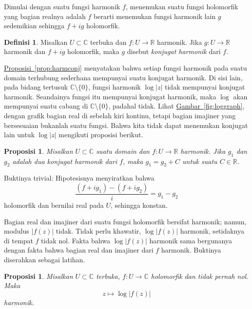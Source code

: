 \documentclass[12pt,openany]{book}
\newcommand{\sabs}[1]{\lvert {#1} \rvert}
\newcommand{\C}{{\mathbb{C}}}
\newcommand{\R}{{\mathbb{R}}}
\newcommand{\myindex}[1]{#1\index{#1}}
\theoremstyle{plain}
\newtheorem{prop}[thm]{Proposisi}
\theoremstyle{remark}
\theoremstyle{definition}
\newtheorem{defn}[thm]{Definisi}
\theoremstyle{exercise}
\theoremstyle{example}
\newcommand{\figureref}[1]{\hyperref[#1]{Gambar~\ref*{#1}}}
\newcommand{\propref}[1]{\hyperref[#1]{Proposisi~\ref*{#1}}}
\begin{document}
Dimulai dengan suatu fungsi harmonik $f$, menemukan suatu fungsi holomorfik yang
bagian realnya adalah $f$ berarti menemukan fungsi harmonik lain $g$ sedemikian sehingga $f+ig$
holomorfik.

\begin{defn}
Misalkan $U \subset \C$ terbuka dan $f \colon U \to \R$ harmonik.
Jika $g \colon U \to \R$ harmonik dan $f + i g$ holomorfik,
maka $g$ disebut \emph{\myindex{konjugat harmonik}} dari $f$.
\end{defn}

\propref{prop:harmconj}
menyatakan bahwa setiap fungsi harmonik pada suatu domain terhubung sederhana
mempunyai suatu konjugat harmonik. Di sisi lain, pada bidang tertusuk
$\C \setminus \{ 0 \}$, fungsi harmonik $\log \sabs{z}$
tidak mempunyai konjugat harmonik. Seandainya fungsi itu mempunyai konjugat harmonik,
maka $\log$ akan mempunyai suatu cabang di $\C \setminus \{0\}$, padahal tidak.
Lihat \figureref{fig:loggraph}, dengan grafik bagian real di sebelah kiri
kontinu, tetapi bagian imajiner yang bersesuaian bukanlah suatu fungsi.
Bahwa kita tidak dapat menemukan konjugat lain untuk $\log \sabs{z}$
mengikuti proposisi berikut.

\begin{prop} \label{prop:harmonicconjdifferbyconst}
Misalkan
$U \subset \C$ suatu domain dan $f \colon U \to \R$ harmonik.
Jika $g_1$ dan $g_2$ adalah dua konjugat harmonik dari $f$,
maka $g_1 = g_2 + C$ untuk suatu $C \in \R$.
\end{prop}

Buktinya trivial: Hipotesisnya menyiratkan bahwa
\begin{equation*}
\frac{(f + i g_1) - (f + i g_2)}{i} =  g_1-g_2
\end{equation*}
holomorfik dan bernilai real pada $U$, sehingga konstan.

Bagian real dan imajiner dari suatu fungsi holomorfik bersifat harmonik;
namun, modulus $\sabs{f(z)}$ tidak. Tidak perlu khawatir,
$\log \sabs{f(z)}$ harmonik, setidaknya di tempat $f$ tidak nol.
Fakta bahwa $\log \sabs{f(z)}$ harmonik sama bergunanya
dengan fakta bahwa bagian real dan imajiner dari $f$ harmonik.
Buktinya diserahkan sebagai latihan.

\begin{prop} \label{prop:logharm}
Misalkan $U \subset \C$ terbuka, $f \colon U \to \C$ holomorfik
dan tidak pernah nol. Maka
\begin{equation*}
z \mapsto \log \sabs{f(z)}
\end{equation*}
harmonik.
\end{prop}
\end{document}
